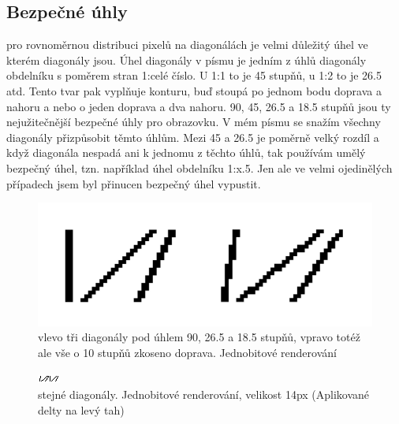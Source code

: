 \documentclass[a4paper]{article}
\begin{document}
\begin{enumerate}
\subsection{Bezpečné úhly}
pro rovnoměrnou distribuci pixelů na diagonálách je velmi důležitý úhel ve kterém diagonály jsou. Úhel diagonály v písmu je jedním z úhlů diagonály obdelníku s poměrem stran 1:celé číslo. U 1:1 to je 45 stupňů, u 1:2 to je 26.5 atd. Tento tvar pak vyplňuje konturu, buď stoupá po jednom bodu doprava a nahoru a nebo o jeden doprava a dva nahoru.
90,
45,
26.5 a 
18.5 stupňů jsou ty nejužitečnější bezpečné úhly pro obrazovku. V mém písmu se snažím všechny diagonály přizpůsobit těmto úhlům. Mezi 45 a 26.5 je poměrně velký rozdíl a když diagonála nespadá ani k jednomu z těchto úhlů, tak používám umělý bezpečný úhel, tzn. například úhel obdelníku 1:x.5. Jen ale ve velmi ojedinělých případech jsem byl přinucen bezpečný úhel vypustit. 

\begin{figure}[H]
  \includegraphics[width=\linewidth]{pics/1bit.png}
  \caption{vlevo tři diagonály pod úhlem 90, 26.5 a 18.5 stupňů, vpravo totéž ale vše o 10 stupňů zkoseno doprava. Jednobitové renderování}
\end{figure}

\begin{figure}[H]
  \includegraphics[width=\linewidth]{pics/bw.png}
  \caption{stejné diagonály. Jednobitové renderování, velikost 14px (Aplikované delty na levý tah)}
\end{figure}


\end{enumerate}
\end{document}
